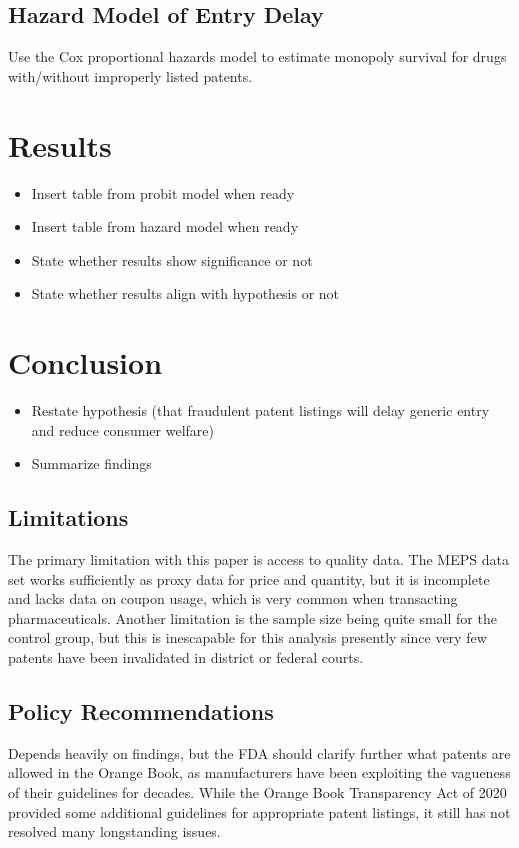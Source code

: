 \documentclass[12pt,a4paper]{article}
\begin{document}
\subsection{Hazard Model of Entry Delay}

Use the Cox proportional hazards model to estimate monopoly survival for drugs with/without improperly listed patents. 

\section{Results}

\begin{itemize}
    \item Insert table from probit model when ready
    \item Insert table from hazard model when ready
    \item State whether results show significance or not
    \item State whether results align with hypothesis or not
\end{itemize}

\section{Conclusion}

\begin{itemize}
    \item Restate hypothesis (that fraudulent patent listings will delay generic entry and reduce consumer welfare)
    \item Summarize findings
\end{itemize}

\subsection{Limitations}

The primary limitation with this paper is access to quality data. The MEPS data set works sufficiently as proxy data for price and quantity, but it is incomplete and lacks data on coupon usage, which is very common when transacting pharmaceuticals. Another limitation is the sample size being quite small for the control group, but this is inescapable for this analysis presently since very few patents have been invalidated in district or federal courts.

\subsection{Policy Recommendations}

Depends heavily on findings, but the FDA should clarify further what patents are allowed in the Orange Book, as manufacturers have been exploiting the vagueness of their guidelines for decades. While the Orange Book Transparency Act of 2020 provided some additional guidelines for appropriate patent listings, it still has not resolved many longstanding issues.


\printbibliography
\end{document}
